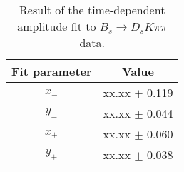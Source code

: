 \begin{table}[h]
\centering
\caption{Result of the time-dependent amplitude fit to $B_s \to D_s K \pi \pi$ data.}
\begin{tabular}{c c}
\hline
\hline
Fit parameter & Value \\
\hline
$x_{-}$ &  xx.xx  $\pm$ 0.119\\
$y_{-}$ &  xx.xx  $\pm$ 0.044\\
$x_{+}$ &  xx.xx  $\pm$ 0.060\\
$y_{+}$ &  xx.xx  $\pm$ 0.038\\
\hline
\hline
\end{tabular}
\label{table:fullFit_signal}
\end{table}